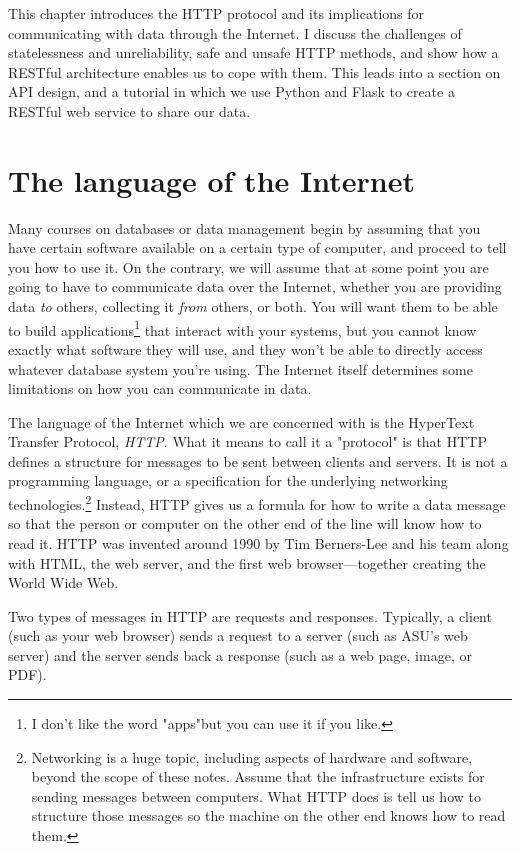 \documentclass[11pt]{book}
\newcommand{\term}[1]{\emph{#1}} %
\begin{document}
This chapter introduces the HTTP protocol and its implications for communicating with data through the Internet.  I discuss the challenges of statelessness and unreliability, safe and unsafe HTTP methods, and show how a RESTful architecture enables us to cope with them.  This leads into a section on API design, and a tutorial in which we use Python and Flask to create a RESTful web service to share our data.

\section{The language of the Internet}

Many courses on databases or data management begin by assuming that you have certain software available on a certain type of computer, and proceed to tell you how to use it.  On the contrary, we will assume that at some point you are going to have to communicate data over the Internet, whether you are providing data \emph{to} others, collecting it \emph{from} others, or both.  You will want them to be able to build applications\footnote{I don't like the word "apps"but you can use it if you like.} that interact with your systems, but you cannot know exactly what software they will use, and they won't be able to directly access whatever database system you're using.  The Internet itself determines some limitations on how you can communicate in data.

The language of the Internet which we are concerned with is the HyperText Transfer Protocol, \term{HTTP}.  What it means to call it a "protocol" is that HTTP defines a structure for messages to be sent between clients and servers.  It is not a programming language, or a specification for the underlying networking technologies.\footnote{Networking is a huge topic, including aspects of hardware and software, beyond the scope of these notes.  Assume that the infrastructure exists for sending messages between computers.  What HTTP does is tell us how to structure those messages so the machine on the other end knows how to read them.}  Instead, HTTP gives us a formula for how to write a data message so that the person or computer on the other end of the line will know how to read it.  HTTP was invented around 1990 by Tim Berners-Lee and his team along with HTML, the web server, and the first web browser---together creating the World Wide Web.

Two types of messages in HTTP are requests and responses.  Typically, a client (such as your web browser) sends a request to a server (such as ASU's web server) and the server sends back a response (such as a web page, image, or PDF).
\end{document}
